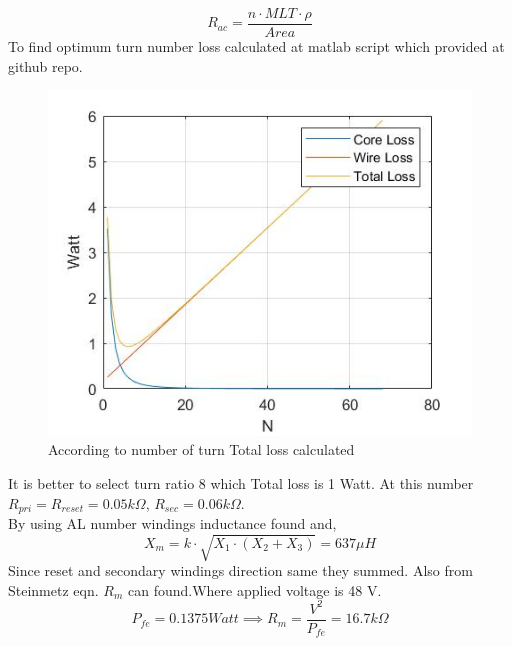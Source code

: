 \documentclass{article}
\begin{document}
\begin{equation}
    R_{ac}=\frac{n\cdot MLT \cdot \rho}{Area }
\end{equation}
To find optimum turn number loss calculated at matlab script which provided at github repo.
\begin{figure}[H]
    \centering
    \includegraphics[width=0.5\linewidth]{number.jpg}
    \caption {According to number of turn Total loss calculated}
    \label{fig:sepic_cap_ideal}
\end{figure}
It is better to select turn ratio 8 which Total loss is 1 Watt.
At this number $R_{pri}=R_{reset}=0.05 k\Omega$, $R_{sec}=0.06 k\Omega$.\\
By using AL number windings inductance found and,
\begin{equation}
    X_m=k\cdot \sqrt{X_1\cdot (X_2+X_3)}=637 \mu H 
\end{equation}
Since reset and secondary windings direction same they summed. Also from Steinmetz eqn. $R_m$ can found.Where applied voltage is 48 V.
\begin{equation}
    P_{fe}=0.1375 Watt \implies R_m=\frac{V^2}{P_{fe}}=16.7k\Omega
\end{equation}
\end{document}
